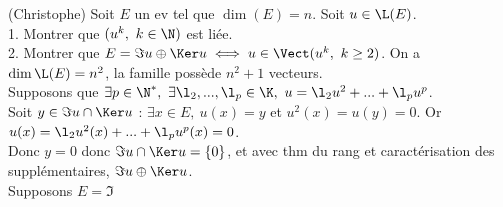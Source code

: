 \documentclass[11pt]{article}
\begin{document}
\begin{exercice}{(Christophe)}{}
    Soit $E$ un ev tel que $\dim(E)=n$. Soit $u\in\L(E)$.\\
    1. Montrer que $(u^k, ~ k\in\N)$ est liée.\\
    2. Montrer que $E=\Im u \oplus \Ker u \iff u \in \Vect(u^k, ~ k \geq 2)$.
    \tcblower
     On a $\dim\L(E)=n^2$, la famille possède $n^2+1$ vecteurs.\\
     Supposons que $\exists p \in \N^*, ~ \exists \l_2, ..., \l_p \in \K, ~ u=\l_2u^2+...+\l_pu^p$.\\
    Soit $y\in\Im u \cap \Ker u$ : $\exists x \in E, ~ u(x)=y$ et $u^2(x)=u(y)=0$. Or $u(x)=\l_2u^2(x)+...+\l_pu^p(x)=0$.\\
    Donc $y=0$ donc $\Im u \cap \Ker u = \{0\}$, et avec thm du rang et caractérisation des supplémentaires, $\Im u \oplus \Ker u$.\\
     Supposons $E=\Im $
\end{exercice}
\end{document}
